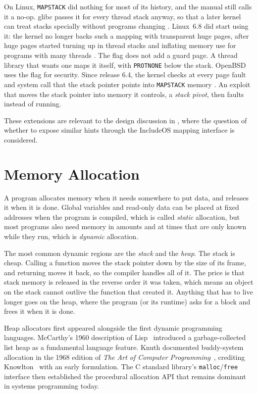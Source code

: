 \documentclass[12pt]{report}
\newcommand{\fullref}[1]{\Cref{#1}}
\renewcommand{\_}{\origunderscore\allowbreak}
\begin{document}
On Linux, \texttt{MAP\_STACK} did nothing for most of its history, and the manual still calls it a no-op. glibc passes it for every thread stack anyway, so that a later kernel can treat stacks specially without programs changing \cite{linux-mmap-man}. Linux~6.8 did start using it: the kernel no longer backs such a mapping with transparent huge pages, after huge pages started turning up in thread stacks and inflating memory use for programs with many threads \cite{linux-mapstack-thp}. The flag does not add a guard page. A thread library that wants one maps it itself, with \texttt{PROT\_NONE} below the stack. OpenBSD uses the flag for security. Since release 6.4, the kernel checks at every page fault and system call that the stack pointer points into \texttt{MAP\_STACK} memory \cite{openbsd64}. An exploit that moves the stack pointer into memory it controls, a \emph{stack pivot}, then faults instead of running.

These extensions are relevant to the design discussion in \fullref{sec:design}, where the question of whether to expose similar hints through the IncludeOS mapping interface is considered.

\section{Memory Allocation}
\label{sec:memory-allocation}

A program allocates memory when it needs somewhere to put data, and releases it when it is done. Global variables and read-only data can be placed at fixed addresses when the program is compiled, which is called \emph{static} allocation, but most programs also need memory in amounts and at times that are only known while they run, which is \emph{dynamic} allocation.

The most common dynamic regions are the \emph{stack} and the \emph{heap}. The stack is cheap. Calling a function moves the stack pointer down by the size of its frame, and returning moves it back, so the compiler handles all of it. The price is that stack memory is released in the reverse order it was taken, which means an object on the stack cannot outlive the function that created it. Anything that has to live longer goes on the heap, where the program (or its runtime) asks for a block and frees it when it is done.

Heap allocators first appeared alongside the first dynamic programming languages. McCarthy's 1960 description of Lisp~\cite{mccarthy1960lisp} introduced a garbage-collected list heap as a fundamental language feature. Knuth documented buddy-system allocation in the 1968 edition of \emph{The Art of Computer Programming}~\cite{knuth1968taocp}, crediting Knowlton~\cite{knowlton1965} with an early formulation. The C standard library's \texttt{malloc}/\texttt{free} interface then established the procedural allocation API that remains dominant in systems programming today.
\end{document}
